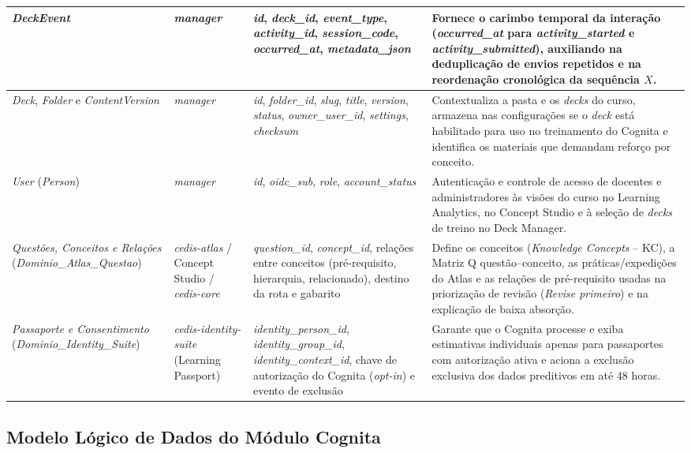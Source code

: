 {\begin{longtable}{>{\raggedright\arraybackslash}p{3.0cm}>{\raggedright\arraybackslash}p{2.4cm}>{\raggedright\arraybackslash}p{3.8cm}>{\raggedright\arraybackslash}p{4.6cm}}
\hline
\textit{DeckEvent} & \textit{manager} & \textit{id}, \textit{deck\_id}, \textit{event\_type}, \textit{activity\_id}, \textit{session\_code}, \textit{occurred\_at}, \textit{metadata\_json} & Fornece o carimbo temporal da interação (\textit{occurred\_at} para \textit{activity\_started} e \textit{activity\_submitted}), auxiliando na deduplicação de envios repetidos e na reordenação cronológica da sequência $X$. \\
\hline
\textit{Deck}, \textit{Folder} e \textit{ContentVersion} & \textit{manager} & \textit{id}, \textit{folder\_id}, \textit{slug}, \textit{title}, \textit{version}, \textit{status}, \textit{owner\_user\_id}, \textit{settings}, \textit{checksum} & Contextualiza a pasta e os \textit{decks} do curso, armazena nas configurações se o \textit{deck} está habilitado para uso no treinamento do Cognita e identifica os materiais que demandam reforço por conceito. \\
\hline
\textit{User} (\textit{Person}) & \textit{manager} & \textit{id}, \textit{oidc\_sub}, \textit{role}, \textit{account\_status} & Autenticação e controle de acesso de docentes e administradores às visões do curso no Learning Analytics, no Concept Studio e à seleção de \textit{decks} de treino no Deck Manager. \\
\hline
\textit{Questões, Conceitos e Relações} (\textit{Dominio\_\allowbreak Atlas\_Questao}) & \textit{cedis-atlas} / Concept Studio / \textit{cedis-core} & \textit{question\_id}, \textit{concept\_id}, relações entre conceitos (pré-requisito, hierarquia, relacionado), destino da rota e gabarito & Define os conceitos (\textit{Knowledge Concepts} -- KC), a Matriz Q questão--conceito, as práticas/expedições do Atlas e as relações de pré-requisito usadas na priorização de revisão (\textit{Revise primeiro}) e na explicação de baixa absorção. \\
\hline
\textit{Passaporte e Consentimento} (\textit{Dominio\_\allowbreak Identity\_Suite}) & \textit{cedis-identity-\allowbreak suite} (Learning Passport) & \textit{identity\_person\_id}, \textit{identity\_group\_id}, \textit{identity\_context\_id}, chave de autorização do Cognita (\textit{opt-in}) e evento de exclusão & Garante que o Cognita processe e exiba estimativas individuais apenas para passaportes com autorização ativa e aciona a exclusão exclusiva dos dados preditivos em até 48 horas. \\
\hline
\end{longtable}
}

\subsection{Modelo Lógico de Dados do Módulo Cognita}
\label{subsec:der-cognita}

